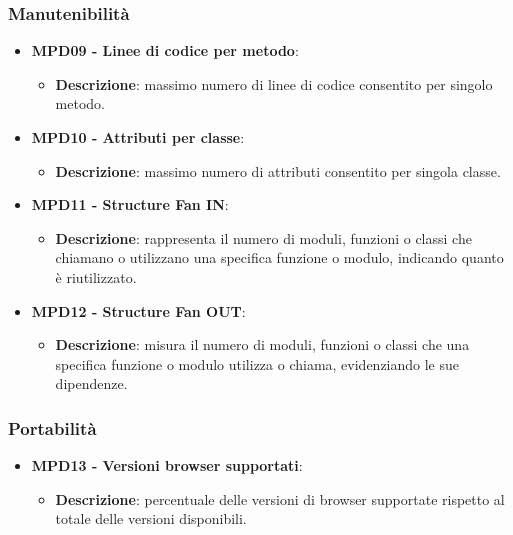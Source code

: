 \documentclass[10pt]{article}
\begin{document}
\begin{justify}
\subsubsection{Manutenibilità}
\begin{itemize}
    \item \textbf{MPD09 - Linee di codice per metodo}:
      \begin{itemize}
        \item \textbf{Descrizione}: massimo numero di linee di codice consentito per singolo metodo.
      \end{itemize}
    \item \textbf{MPD10 - Attributi per classe}:
      \begin{itemize}
        \item \textbf{Descrizione}: massimo numero di attributi consentito per singola classe.
      \end{itemize}
    \item \textbf{MPD11 - Structure Fan IN}:
      \begin{itemize}
        \item \textbf{Descrizione}: rappresenta il numero di moduli, funzioni o classi che chiamano o utilizzano una specifica funzione o modulo, indicando quanto è riutilizzato.
      \end{itemize}
    \item \textbf{MPD12 - Structure Fan OUT}:
      \begin{itemize}
        \item \textbf{Descrizione}: misura il numero di moduli, funzioni o classi che una specifica funzione o modulo utilizza o chiama, evidenziando le sue dipendenze.
      \end{itemize}
\end{itemize}

\subsubsection{Portabilità}
  \begin{itemize}
    \item \textbf{MPD13 - Versioni browser supportati}:
      \begin{itemize}
        \item \textbf{Descrizione}: percentuale delle versioni di browser supportate rispetto al totale delle versioni disponibili.
      \end{itemize}
\end{itemize}


\end{justify}
\end{document}
